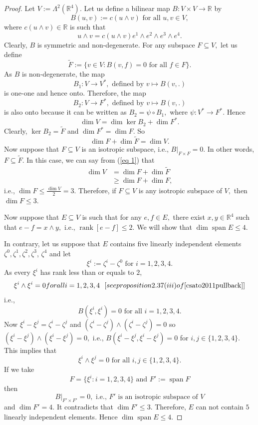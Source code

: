 \documentclass[11pt, a4paper, reqno]{amsart}
\numberwithin{equation}{section}
\newcommand{\spann}{\operatorname{span}}
\newcommand{\rank}{\operatorname{rank}}
\begin{document}
\begin{proof}
Let $V:=\Lambda^2(\mathbb R^4).$ Let us define a bilinear map $B: V\times V \to \mathbb R$ by $$ B(u,v):=c(u\wedge v) \textrm{ for all } u,v\in V,$$
where $c(u \wedge v)\in \mathbb R$ is such that $$u\wedge v =c(u\wedge v) e^1\wedge e^2\wedge e^3 \wedge e^4.$$
Clearly, $B$ is symmetric and non-degenerate. For any subspace $F\subseteq V,$ let us define $$\tilde{F}:=\{v\in V: B(v,f)=0 \textrm{ for all }f\in F\}.$$
As $B$ is non-degenerate, the map $$B_1: V\to V^*,\textrm{ defined by }v\mapsto B(v,.)$$
is one-one and hence onto. Therefore, the map $$B_2:V\to F^*,\textrm{ defined by }v\mapsto B(v,.)$$ is also onto because  it can be written as $B_2=\psi \circ B_1,$ where $\psi : V^*\to F^*.$ Hence $$\dim V=\dim \ker B_2+\dim F^*.$$
Clearly, $\ker B_2=\tilde{F}$ and $\dim F^*=\dim F$. So 
\begin{equation} \label{eq 1}
\dim F+ \dim \tilde{F}=\dim V.
\end{equation}
Now suppose that $F\subseteq V$ is an isotropic subspace, i.e., $B|_{F\times F}=0.$ In other words, $F\subseteq \tilde{F}.$ In this case, we can say from (\ref{eq 1}) that 
\begin{align*}
\dim V&=\dim F+\dim \tilde{F}\\
&\geq \dim F+ \dim F,
\end{align*}
i.e., $\dim F\leq \frac{\dim V}{2}=3.$
Therefore, if $F\subseteq V$ is any isotropic subspace of $V,$ then $\dim F\leq 3.$

Now suppose that $E\subseteq V$ is such that  for any $e,f\in E,$ there exist $x,y\in \mathbb R^4$ such that $e-f=x\wedge y,$ i.e., $\rank[e-f]\leq 2.$ We will show that $\dim \spann E\leq 4.$

In contrary, let us suppose that $E$ contains five linearly independent elements $\zeta^0,\zeta^1,\zeta^2,\zeta^3$, $\zeta^4$ and let $$\xi^i:=\zeta^i-\zeta^0\textrm{ for }i=1,2,3,4.$$
As every $\xi^i$ has rank less than or equals to $2$, $$\xi^i\wedge \xi^i=0\textrm{ for all }i=1,2,3,4  \ \  \textrm{ [see proposition 2.37(iii) of \cite{csato2011pullback}]}$$
i.e., $$B(\xi^i,\xi^i)=0\textrm{ for all }i=1,2,3,4.$$ Now $\xi^i-\xi^j=\zeta^i-\zeta^j$ and $(\zeta^i-\zeta^j)\wedge (\zeta^i-\zeta^j)=0$ so $(\xi^i-\xi^j)\wedge (\xi^i-\xi^j)=0,$ i.e., $B(\xi^i-\xi^j, \xi^i-\xi^j)=0$ for $i,j\in \{1,2,3,4\}.$ This implies that $$\xi^i\wedge \xi^j=0\textrm{ for all }i,j\in \{1,2,3,4\}.$$
If we take $$F=\{\xi^i: i=1,2,3,4\}\textrm{ and }F':=\spann F$$
then $$B|_{F'\times F'}=0,\textrm{ i.e., } F' \textrm{ is an isotropic subspace of } V$$
and $\dim F'=4.$ It contradicts that $\dim F'\leq 3.$
Therefore, $E$ can not contain $5$ linearly independent elements. Hence $\dim \spann E\leq 4.$
\end{proof}
\end{document}
